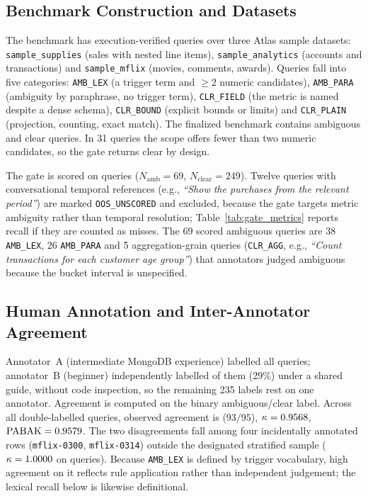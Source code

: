 \subsection{Benchmark Construction and Datasets}
The benchmark has \numTotalQueries{} execution-verified queries over three Atlas sample datasets: \texttt{sample\_supplies} (sales with nested line items), \texttt{sample\_analytics} (accounts and transactions) and \texttt{sample\_mflix} (movies, comments, awards). Queries fall into five categories: \texttt{AMB\_LEX} (a trigger term and $\ge 2$ numeric candidates), \texttt{AMB\_PARA} (ambiguity by paraphrase, no trigger term), \texttt{CLR\_FIELD} (the metric is named despite a dense schema), \texttt{CLR\_BOUND} (explicit bounds or limits) and \texttt{CLR\_PLAIN} (projection, counting, exact match). The finalized benchmark contains \numAmbiguousQueries{} ambiguous and \numClearQueries{} clear queries. In 31 queries the scope offers fewer than two numeric candidates, so the gate returns clear by design.

The gate is scored on \gateScoredN{} queries ($N_{\text{amb}} = 69$, $N_{\text{clear}} = 249$). Twelve queries with conversational temporal references (e.g., \emph{``Show the purchases from the relevant period''}) are marked \texttt{OOS\_UNSCORED} and excluded, because the gate targets metric ambiguity rather than temporal resolution; Table~\ref{tab:gate_metrics} reports recall if they are counted as misses. The 69 scored ambiguous queries are 38 \texttt{AMB\_LEX}, 26 \texttt{AMB\_PARA} and 5 aggregation-grain queries (\texttt{CLR\_AGG}, e.g., \emph{``Count transactions for each customer age group''}) that annotators judged ambiguous because the bucket interval is unspecified.

\subsection{Human Annotation and Inter-Annotator Agreement}
Annotator~A (intermediate MongoDB experience) labelled all \numTotalQueries{} queries; annotator~B (beginner) independently labelled \numDoubleLabelAll{} of them (29\%) under a shared guide, without code inspection, so the remaining 235 labels rest on one annotator. Agreement is computed on the binary ambiguous/clear label. Across all \numDoubleLabelAll{} double-labelled queries, observed agreement is \observedAgreementAll{} ($93/95$), $\kappa = 0.9568{}$, $\text{PABAK} = 0.9579{}$. The two disagreements fall among four incidentally annotated rows (\texttt{mflix-0300}, \texttt{mflix-0314}) outside the designated stratified sample ($\kappa = 1.0000{}$ on \numDoubleLabelStratified{} queries). Because \texttt{AMB\_LEX} is defined by trigger vocabulary, high agreement on it reflects rule application rather than independent judgement; the lexical recall below is likewise definitional.


